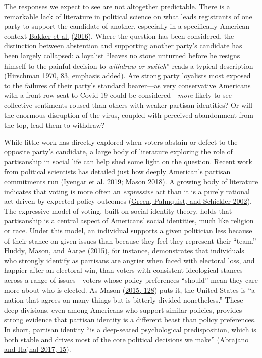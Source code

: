 \documentclass[
  12pt,
]{article}
\begin{document}
The responses we expect to see are not altogether predictable. There is a remarkable lack of literature in political science on what leads registrants of one party to support the candidate of another, especially in a specifically American context \protect\hyperlink{ref-Bakker2016}{Bakker et al.} (\protect\hyperlink{ref-Bakker2016}{2016}). Where the question has been considered, the distinction between abstention and supporting another party's candidate has been largely collapsed: a loyalist ``leaves no stone unturned before he resigns himself to the painful decision to \emph{withdraw or switch}'' reads a typical description (\protect\hyperlink{ref-Hirschman1970a}{Hirschman 1970, 83}, emphasis added). Are strong party loyalists most exposed to the failures of their party's standard bearer---as very conservative Americans with a front-row seat to Covid-19 could be considered---\emph{more} likely to see collective sentiments roused than others with weaker partisan identities? Or will the enormous disruption of the virus, coupled with perceived abandonment from the top, lead them to withdraw?

While little work has directly explored when voters abstain or defect to the opposite party's candidate, a large body of literature exploring the role of partisanship in social life can help shed some light on the question. Recent work from political scientists has detailed just how deeply American's partisan commitments run (\protect\hyperlink{ref-Iyengar2019}{Iyengar et al. 2019}; \protect\hyperlink{ref-Mason2018}{Mason 2018}). A growing body of literature indicates that voting is more often an \emph{expressive} act than it is a purely rational act driven by expected policy outcomes (\protect\hyperlink{ref-Green2002}{Green, Palmquist, and Schickler 2002}). The expressive model of voting, built on social identity theory, holds that partisanship is a central aspect of Americans' social identities, much like religion or race. Under this model, an individual supports a given politician less because of their stance on given issues than because they feel they represent their ``team.'' \protect\hyperlink{ref-Huddy2015}{Huddy, Mason, and Aarøe} (\protect\hyperlink{ref-Huddy2015}{2015}), for instance, demonstrates that individuals who strongly identify as partisans are angrier when faced with electoral loss, and happier after an electoral win, than voters with consistent ideological stances across a range of issues---voters whose policy preferences ``should'' mean they care more about who is elected. As Mason (\protect\hyperlink{ref-Mason2015}{2015, 128}) puts it, the United States is ``a nation that agrees on many things but is bitterly divided nonetheless.'' These deep divisions, even among Americans who support similar policies, provides strong evidence that partisan identity is a different beast than policy preferences. In short, partisan identity ``is a deep-seated psychological predisposition, which is both stable and drives most of the core political decisions we make'' (\protect\hyperlink{ref-Abrajano2017}{Abrajano and Hajnal 2017, 15}).
\end{document}
